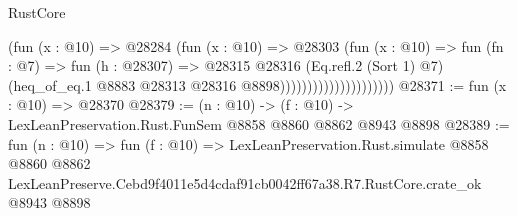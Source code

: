 \begin{lexlean}{RustCore}
\begin{coremodule}
                                      (fun (x : @10) =>
                                      @28284
                                        (fun (x : @10) =>
                                        @28303
                                          (fun (x : @10) =>
                                          fun (fn : @7) =>
                                          fun (h : @28307) =>
                                          @28315
                                            @28316
                                            (Eq.refl.{2} (Sort 1) @7)
                                            (heq_of_eq.{1}
                                              @8883
                                              @28313
                                              @28316
                                              @8898)))))))))))))))))))))
@28371 := fun (x : @10) => @28370
@28379 := (n : @10) -> (f : @10) -> LexLeanPreservation.Rust.FunSem @8858 @8860 @8862 @8943 @8898
@28389 := fun (n : @10) =>
  fun (f : @10) =>
  LexLeanPreservation.Rust.simulate
    @8858
    @8860
    @8862
    LexLeanPreserve.Cebd9f4011e5d4cdaf91cb0042ff67a38.R7.RustCore.crate_ok
    @8943
    @8898
\end{coremodule}
\end{lexlean}
